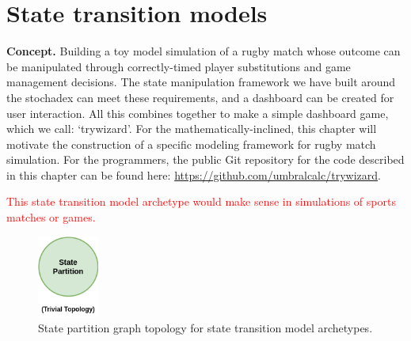 \chapter{\sffamily State transition models}

{\bfseries\sffamily Concept.} Building a toy model simulation of a rugby match whose outcome can be manipulated through correctly-timed player substitutions and game management decisions. The state manipulation framework we have built around the stochadex can meet these requirements, and a dashboard can be created for user interaction. All this combines together to make a simple dashboard game, which we call: `trywizard'. For the mathematically-inclined, this chapter will motivate the construction of a specific modeling framework for rugby match simulation. For the programmers, the public Git repository for the code described in this chapter can be found here: \href{https://github.com/umbralcalc/trywizard}{https://github.com/umbralcalc/trywizard}.

\textcolor{red}{This state transition model archetype would make sense in simulations of sports matches or games.}


\begin{figure}[h]
\centering
\includegraphics[width=2cm]{images/chapter-6-state-partition-graph.drawio.png}
\caption{State partition graph topology for state transition model archetypes.}
\label{fig:state-partition-graph-state-transition-models}
\end{figure}

